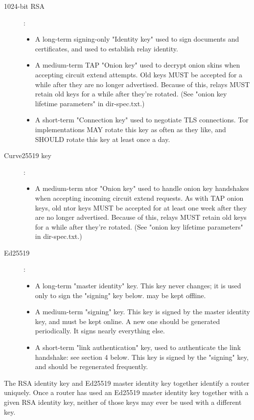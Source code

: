 \begin{description}
	\item [1024-bit RSA] :
	\begin{itemize}
		\item A long-term signing-only "Identity key" used to sign documents and certificates, and used to establish relay identity.
		\item A medium-term TAP "Onion key" used to decrypt onion skins when accepting circuit extend attempts.%
		Old keys MUST be accepted for a while after they are no longer advertised.  Because of this, relays MUST retain old keys for a while after they're rotated. (See "onion key lifetime parameters" in dir-spec.txt.) %
		\item A short-term "Connection key" used to negotiate TLS connections. Tor implementations MAY rotate this key as often as they like, and SHOULD rotate this key at least once a day.
	\end{itemize}
	\item [Curve25519 key] :
	\begin{itemize}
		\item A medium-term ntor "Onion key" used to handle onion key handshakes when accepting incoming circuit extend requests.  As with TAP onion keys, old ntor keys MUST be accepted for at least one week after they are no longer advertised.  Because of this, relays MUST retain old keys for a while after they're rotated. (See "onion key lifetime parameters" in dir-spec.txt.) %
	\end{itemize}
	\item [Ed25519] :
	\begin{itemize}
		\item A long-term "master identity" key.  This key never changes; it is used only to sign the "signing" key below. may be kept offline.
		\item A medium-term "signing" key.  This key is signed by the master identity key, and must be kept online.  A new one should be generated periodically.  It signs nearly everything else.
		\item A short-term "link authentication" key, used to authenticate the link handshake: see section 4 below.  This key is signed by the "signing" key, and should be regenerated frequently.%
	\end{itemize}
\end{description}

The RSA identity key and Ed25519 master identity key together identify a router uniquely.  Once a router has used an Ed25519 master identity key together with a given RSA identity key, neither of those keys may ever be used with a different key.

